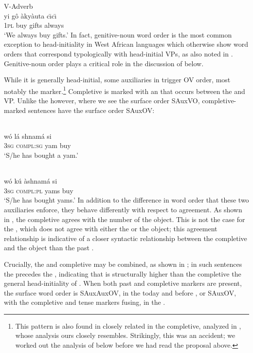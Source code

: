 \documentclass[output=paper]{LSP/langsci}
\begin{document}
\ex \label{ex:12c:gwari} {V-Adverb}\\
\gll yi g\^o \`aky\`auta {c\=\i c\=\i} \\
1\textsc{pl} buy gifts always \\
\glt `We always buy gifts.' \hfill \citep[][51]{hyman1970}
\z
\z
In fact, genitive-noun word order is the most common exception to head-initiality in West African languages which otherwise show word orders that correspond typologically with head-initial VPs, as also noted in \citet{heine76}. Genitive-noun order plays a critical role in the discussion of  below.

While it is generally head-initial, some auxiliaries in  trigger OV order, most notably the  marker.\footnote{This pattern is also found in closely related  in the completive, analyzed in \citet{kandy03}, whose analysis ours closely resembles. Strikingly, this was an accident; we worked out the analysis of  below before we had read the proposal above.} Completive  is marked with an  that occurs between the  and VP. Unlike the  however, where we see the surface order SAuxVO, completive-marked sentences have the surface order SAuxOV:

\ea \label{ex:13:gwari}
	\\
\gll w\'o l\'a shnam\'a si \\
3\textsc{sg} \textsc{compl:sg} yam buy \\
\glt `S/he has bought a yam.' \hfill \citep[][64]{hyman1970}

	\\
\gll w\'o  k\'u \`ashnam\'a si \\
3\textsc{sg} \textsc{compl:pl} yams buy \\
\glt `S/he has bought yams.' \hfill \citep[][56]{hyman1970}
\z
\z
In addition to the difference in word order that these two auxiliaries enforce, they behave differently with respect to agreement. As shown in , the completive  agrees with the number of the object. This is not the case for the  , which does not agree with either the  or the object; this agreement relationship is indicative of a closer syntactic relationship between the completive and the object than the past .

Crucially, the   and completive  may be combined, as shown in ; in such sentences the  precedes the , indicating that  is structurally higher than the completive the general head-initiality of  . When both past and completive markers are present, the surface word order is SAuxAuxOV, in the today and before , or SAuxOV, with the completive and tense markers fusing, in the .
\end{document}
